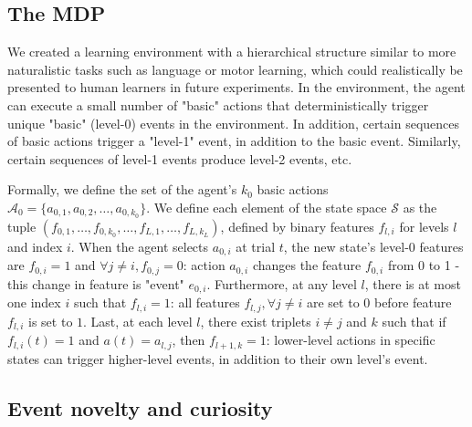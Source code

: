 \documentclass{article}
\begin{document}
\subsection{The MDP}

We created a learning environment with a hierarchical structure similar to more naturalistic tasks such as language or motor learning, which could realistically be presented to human learners in future experiments.
In the environment, the agent can execute a small number of "basic" actions that deterministically trigger unique "basic" (level-0) events in the environment. In addition, certain sequences of basic actions trigger a "level-1" event, in addition to the basic event. Similarly, certain sequences of level-1 events produce level-2 events, etc. %

Formally, we define the set of the agent's $k_0$ basic actions $\mathcal{A}_0 = \{a_{0, 1}, a_{0, 2}, \ldots, a_{0, k_0}\}$. We define each element of the state space $\mathcal{S}$ as the tuple $(f_{0, 1}, \ldots, f_{0, k_0}, \ldots, f_{L, 1}, \ldots, f_{L, k_L})$, defined by binary features $f_{l, i}$ for levels $l$ and index $i$. When the agent selects $a_{0,i}$ at trial $t$, the new state's level-0 features are $f_{0,i}=1$ and $\forall j \neq i, f_{0,j}=0$: action $a_{0, i}$ changes the feature $f_{0, i}$ from 0 to 1 - this change in feature is "event" $e_{0, i}$. Furthermore, at any level $l$, there is at most one index $i$ such that $f_{l,i}=1$: all features $f_{l, j}, \forall j\neq i$ are set to $0$ before feature $f_{l, i}$ is set to $1$. Last, at each level $l$, there exist triplets $i \neq j$ and $k$ such that if $f_{l,i}(t)=1$ and $a(t)=a_{l,j}$, then $f_{l+1, k}=1$: lower-level actions in specific states can trigger higher-level events, in addition to their own level's event.

\subsection{Event novelty and curiosity}
\end{document}
